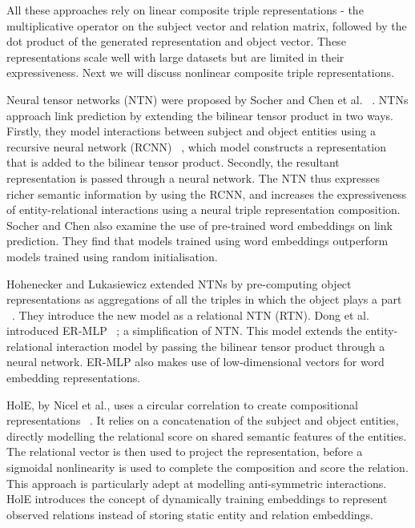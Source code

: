 \noindent All these approaches rely on linear composite triple representations - the multiplicative operator on the subject vector and relation matrix, followed by the dot product of the generated representation and object vector. These representations scale well with large datasets but are limited in their expressiveness. Next we will discuss nonlinear composite triple representations. \par

\noindent Neural tensor networks (NTN) were proposed by Socher and Chen et al. \unskip~\citep{socher2013reasoning}. NTNs approach link prediction by extending the bilinear tensor product in two ways. Firstly, they model interactions between subject and object entities using a recursive neural network (RCNN) \unskip~\citep{socher2012semantic}, which model constructs a representation that is added to the bilinear tensor product. Secondly, the resultant representation is passed through a neural network. The NTN thus expresses richer semantic information by using the RCNN, and increases the expressiveness of entity-relational interactions using a neural triple representation composition. Socher and Chen also examine the use of pre-trained word embeddings on link prediction. They find that models trained using word embeddings outperform models trained using random initialisation. \par

\noindent Hohenecker and Lukasiewicz extended NTNs by pre-computing object representations as aggregations of all the triples in which the object plays a part \unskip~\citep{hohenecker2017deep}. They introduce the new model as a relational NTN (RTN). Dong et al. introduced ER-MLP \unskip~\citep{dong2014knowledge, nickel2015review}; a simplification of NTN. This model extends the entity-relational interaction model by passing the bilinear tensor product through a neural network. ER-MLP also makes use of low-dimensional vectors for word embedding representations. \par

\noindent HolE, by Nicel et al., uses a  circular correlation to create compositional representations \unskip~\citep{nickel2016holographic}. It relies on a concatenation of the subject and object entities, directly modelling the relational score on shared semantic features of the entities. The relational vector is then used to project the representation, before a sigmoidal nonlinearity is used to complete the composition and score the relation. This approach is particularly adept at modelling anti-symmetric interactions. HolE introduces the concept of dynamically training embeddings to represent observed relations instead of storing static entity and relation embeddings. \par

